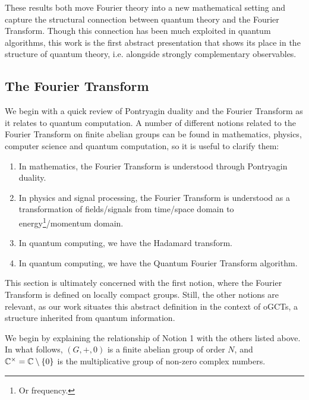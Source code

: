 
These results both move Fourier theory into a new mathematical setting and capture the structural connection between quantum theory and the Fourier Transform.  Though this connection has been much exploited in quantum algorithms, this work is the first abstract presentation that shows its place in the structure of quantum theory, i.e. alongside strongly complementary observables.
\subsection{The Fourier Transform}
\label{sec:FT}
We begin with a quick review of Pontryagin duality and the Fourier Transform as it relates to quantum computation. A number of different notions related to the Fourier Transform on finite abelian groups can be found in mathematics, physics, computer science and quantum computation, so it is useful to clarify them:

\begin{enumerate}
  \item[1.] In mathematics, the Fourier Transform is understood through Pontryagin duality.
  \item[2.] In physics and signal processing, the Fourier Transform is understood as a transformation of fields/signals from time/space domain to energy\footnote{Or frequency.}/momentum domain.
  \item[3.] In quantum computing, we have the Hadamard transform.
  \item[4.] In quantum computing, we have the Quantum Fourier Transform algorithm.
\end{enumerate}

This section is ultimately concerned with the first notion, where the Fourier Transform is defined on locally compact groups. Still, the other notions are relevant, as our work situates this abstract definition in the context of oGCTs, a structure inherited from quantum information. 

We begin by explaining the relationship of Notion 1 with the others listed above. In what follows, $(G,+,0)$ is a finite abelian group of order $N$, and $\mathbb{C}^{\times}=\mathbb{C}\setminus\{0\}$ is the multiplicative group of non-zero complex numbers.

